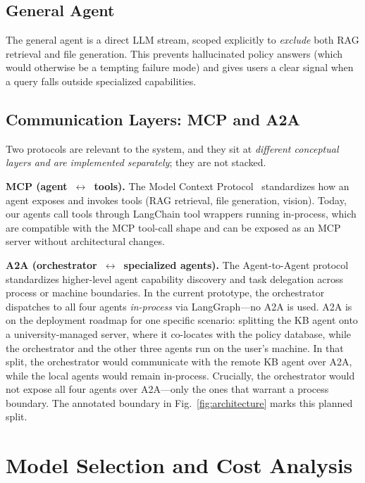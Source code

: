 \documentclass[conference]{IEEEtran}
\begin{document}
\subsection{General Agent}

The general agent is a direct LLM stream, scoped explicitly to \emph{exclude} both RAG retrieval and file generation. This prevents hallucinated policy answers (which would otherwise be a tempting failure mode) and gives users a clear signal when a query falls outside specialized capabilities.

\subsection{Communication Layers: MCP and A2A}
\label{sec:comm}

Two protocols are relevant to the system, and they sit at \emph{different conceptual layers and are implemented separately}; they are not stacked.

\textbf{MCP (agent~$\leftrightarrow$~tools).} The Model Context Protocol~\cite{anthropic_mcp_2024} standardizes how an agent exposes and invokes tools (RAG retrieval, file generation, vision). Today, our agents call tools through LangChain tool wrappers running in-process, which are compatible with the MCP tool-call shape and can be exposed as an MCP server without architectural changes.

\textbf{A2A (orchestrator~$\leftrightarrow$~specialized agents).} The Agent-to-Agent protocol~\cite{google_a2a_2025} standardizes higher-level agent capability discovery and task delegation across process or machine boundaries. In the current prototype, the orchestrator dispatches to all four agents \emph{in-process} via LangGraph---no A2A is used. A2A is on the deployment roadmap for one specific scenario: splitting the KB agent onto a university-managed server, where it co-locates with the policy database, while the orchestrator and the other three agents run on the user's machine. In that split, the orchestrator would communicate with the remote KB agent over A2A, while the local agents would remain in-process. Crucially, the orchestrator would not expose all four agents over A2A---only the ones that warrant a process boundary. The annotated boundary in Fig.~\ref{fig:architecture} marks this planned split.

\section{Model Selection and Cost Analysis}
\label{sec:models}
\end{document}
